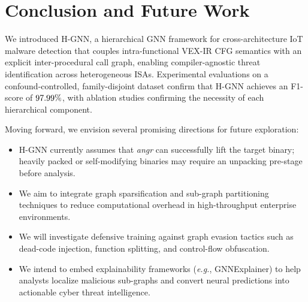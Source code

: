 \documentclass[conference]{IEEEtran}
\newcommand{\method}{H-GNN}
\begin{document}
\section{Conclusion and Future Work}
\label{sec:conclusion}

We introduced \method{}, a hierarchical GNN framework for cross-architecture
IoT malware detection that couples intra-functional VEX-IR CFG semantics
with an explicit inter-procedural call graph, enabling compiler-agnostic
threat identification across heterogeneous ISAs.
Experimental evaluations on a confound-controlled, family-disjoint
dataset confirm that \method{} achieves an F1-score of $97.99\%$, with
ablation studies confirming the necessity of each hierarchical component.

Moving forward, we envision several promising directions for future exploration:
\begin{itemize}
    \item {} \method{} currently assumes that \textit{angr}
    can successfully lift the target binary; heavily packed or self-modifying
    binaries may require an unpacking pre-stage before analysis.
    \item {} We aim to integrate
    graph sparsification and sub-graph partitioning techniques to reduce
    computational overhead in high-throughput enterprise environments.
    \item {} We will investigate defensive
    training against graph evasion tactics such as dead-code injection,
    function splitting, and control-flow obfuscation.
    \item {} We intend
    to embed explainability frameworks (\textit{e.g.}, GNNExplainer) to help
    analysts localize malicious sub-graphs and convert neural predictions into
    actionable cyber threat intelligence.
\end{itemize}
\end{document}
